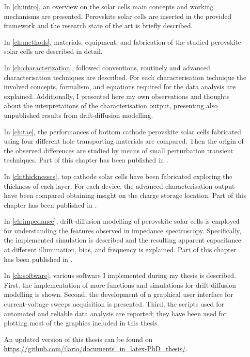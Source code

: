 
\hspace{\parindent}In \cref{ch:intro}, an overview on the solar cells main concepts and working mechanisms are presented.
Perovskite solar cells are inserted in the provided framework and the research state of the art is briefly described.

In \cref{ch:methods}, materials, equipment, and fabrication of the studied perovskite solar cells are described in detail.

In \cref{ch:characterization}, followed conventions, routinely and advanced characterisation techniques are described.
For each characterisation technique the involved concepts, formalism, and equations required for the data analysis are explained.
Additionally, I presented here my own observations and thoughts about the interpretations of the characterisation output, presenting also unpublished results from drift\hyp{}diffusion modelling.

In \cref{ch:tae}, the performances of bottom cathode perovskite solar cells fabricated using four different hole transporting materials are compared.
Then the origin of the observed differences are studied by means of small perturbation transient techniques.
Part of this chapter has been published in \cite{Gelmetti2019}.

In \cref{ch:thicknesses}, top cathode solar cells have been fabricated exploring the thickness of each layer.
For each device, the advanced characterisation output have been compared obtaining insight on the charge storage location.
Part of this chapter has been published in \cite{Gelmetti2017}.

In \cref{ch:impedance}, drift\hyp{}diffusion modelling of perovskite solar cells is employed for understanding the features observed in impedance spectroscopy.
Specifically, the implemented simulation is described and the resulting apparent capacitance at different illumination, bias, and frequency is explained.
Part of this chapter has been published in \cite{Moia2019}.

In \cref{ch:software}, various software I implemented during my thesis is described.
First, the implementation of more functions and simulations for drift\hyp{}diffusion modelling is shown.
Second, the development of a graphical user interface for current\hyp{}voltage sweeps acquisition is presented.
Third, the scripts used for automated and reliable data analysis are reported; they have been used for plotting most of the graphics included in this thesis.

An updated version of this thesis can be found on \url{https://github.com/ilario/documents_in_latex-PhD_thesis/}.